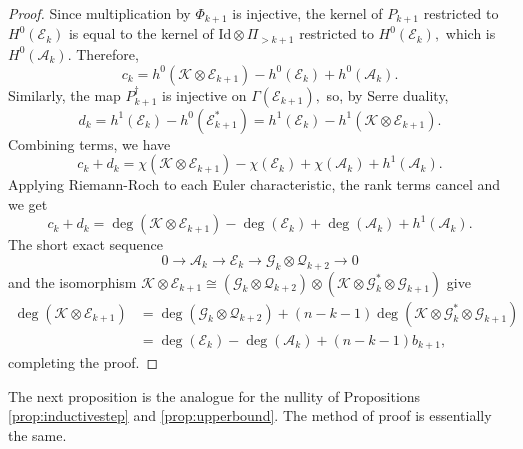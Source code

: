 \documentclass[11pt]{article}
\theoremstyle{definition}
\numberwithin{equation}{section}
\begin{document}
\begin{proof}
    Since multiplication by $\Phi_{k+1}$ is injective, the kernel of $P_{k+1}$ restricted to $H^0(\mathcal{E}_k)$ is equal to the kernel of $\mathrm{Id} \otimes \Pi_{>k+1}$ restricted to $H^0(\mathcal{E}_k),$ which is $H^0(\mathcal{A}_k).$ Therefore,
    \begin{equation*}
        c_k = h^0(\mathcal{K} \otimes \mathcal{E}_{k+1}) - h^0(\mathcal{E}_k) + h^0(\mathcal{A}_k).
    \end{equation*}
    Similarly, the map $P_{k+1}^\dagger$ is injective on $\Gamma(\mathcal{E}_{k+1}),$ so, by Serre duality,
    \begin{equation*}
        d_k =h^1(\mathcal{E}_k) - h^0(\mathcal{E}^*_{k+1}) = h^1(\mathcal{E}_k) - h^1(\mathcal{K} \otimes \mathcal{E}_{k+1}).
    \end{equation*}
    Combining terms, we have
    \begin{equation*}
        c_k + d_k = \chi(\mathcal{K} \otimes \mathcal{E}_{k+1}) - \chi(\mathcal{E}_k) + \chi(\mathcal{A}_k) + h^1(\mathcal{A}_k).
    \end{equation*}
    Applying Riemann-Roch to each Euler characteristic, the rank terms cancel and we get
    \begin{equation*}
        c_k + d_k = \deg (\mathcal{K} \otimes \mathcal{E}_{k+1}) - \deg (\mathcal{E}_k) + \deg (\mathcal{A}_k) + h^1(\mathcal{A}_k).
    \end{equation*}
    The short exact sequence
    \begin{equation*}
        0 \to \mathcal{A}_k \to \mathcal{E}_k \to \mathcal{G}_k \otimes \mathcal{Q}_{k+2} \to 0
    \end{equation*}
    and the isomorphism $\mathcal{K} \otimes \mathcal{E}_{k+1} \cong (\mathcal{G}_k \otimes \mathcal{Q}_{k+2}) \otimes (\mathcal{K} \otimes \mathcal{G}_k^* \otimes \mathcal{G}_{k+1})$ give
    \begin{equation*}
    \begin{aligned}
        \deg(\mathcal{K} \otimes \mathcal{E}_{k+1}) &= \deg (\mathcal{G}_k \otimes \mathcal{Q}_{k+2}) + (n-k-1) \deg (\mathcal{K} \otimes \mathcal{G}_k^* \otimes \mathcal{G}_{k+1}) \\
        &= \deg(\mathcal{E}_k) - \deg(\mathcal{A}_k) + (n-k-1) b_{k+1},
    \end{aligned}
    \end{equation*}
    completing the proof.
\end{proof}

The next proposition is the analogue for the nullity of Propositions \ref{prop:inductivestep} and \ref{prop:upperbound}. The method of proof is essentially the same.
\end{document}
